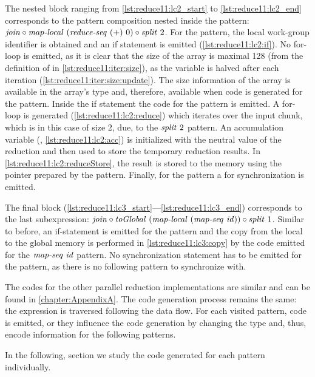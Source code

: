 The nested block ranging from \autoref{lst:reduce11:lc2_start} to \autoref{lst:reduce11:lc2_end} corresponds to the pattern composition nested inside the \iterateN pattern:
$\text{\textit{join}} \circ \text{\textit{map-local}}\ (\text{\textit{reduce-seq}}\ (+)\ 0) \circ \text{\textit{split}}\ 2$.
For the \mapLocal pattern, the local work-group identifier is obtained and an if statement is emitted (\autoref{lst:reduce11:lc2:if}).
No for-loop is emitted, as it is clear that the size of the array is maximal 128 (from the definition of  in \autoref{lst:reduce11:iter:size}), as the variable is halved after each iteration (\autoref{lst:reduce11:iter:size:update}).
The size information of the array is available in the array's type and, therefore, available when code is generated for the \mapLocal pattern.
Inside the if statement the code for the \reduceSeq pattern is emitted.
A for-loop is generated (\autoref{lst:reduce11:lc2:reduce}) which iterates over the input chunk, which is in this case of size 2, due, to the $\text{\textit{split}}\ 2$ pattern.
An accumulation variable (, \autoref{lst:reduce11:lc2:acc}) is initialized with the neutral value of the reduction and then used to store the temporary reduction results.
In \autoref{lst:reduce11:lc2:reduceStore}, the result is stored to the memory using the  pointer prepared by the \iterateN pattern.
Finally, for the \mapLocal pattern a  for synchronization is emitted.

The final block (\autoref{lst:reduce11:lc3_start}---\autoref{lst:reduce11:lc3_end}) corresponds to the last subexpression:
$\text{\textit{join}} \circ \text{\textit{toGlobal}}\ (\text{\textit{map-local}}\ (\text{\textit{map-seq}}\ \text{\textit{id}})) \circ \text{\textit{split}}\ 1$.
Similar to before, an if-statement is emitted for the \mapLocal pattern and the copy from the local to the global memory is performed in \autoref{lst:reduce11:lc3:copy} by the code emitted for the $\text{\textit{map-seq}}\ \text{\textit{id}}$ pattern.
No synchronization statement has to be emitted for the \mapLocal pattern, as there is no following pattern to synchronize with.

\bigskip

The \OpenCL codes for the other parallel reduction implementations are similar and can be found in \autoref{chapter:AppendixA}.
The code generation process remains the same:
the expression is traversed following the data flow.
For each visited pattern, \OpenCL code is emitted, or they influence the code generation by changing the type and, thus, encode information for the following patterns.

In the following, section we study the \OpenCL code generated for each pattern individually.





